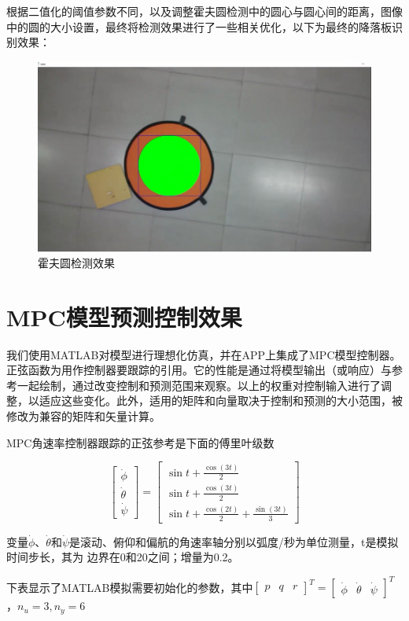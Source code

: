 根据二值化的阈值参数不同，以及调整霍夫圆检测中的圆心与圆心间的距离，图像中的圆的大小设置，最终将检测效果进行了一些相关优化，以下为最终的降落板识别效果：

\begin{figure}[ht]
  \centering
  \includegraphics[width=0.8\linewidth]{./Figure/Hough_Circle_Detection.png}
  \caption{霍夫圆检测效果}\label{Fig:xd1}
\end{figure}

\section{MPC模型预测控制效果}

我们使用MATLAB对模型进行理想化仿真，并在APP上集成了MPC模型控制器。正弦函数为用作控制器要跟踪的引用。它的性能是通过将模型输出（或响应）与参考一起绘制，通过改变控制和预测范围来观察。以上的权重对控制输入进行了调整，以适应这些变化。此外，适用的矩阵和向量取决于控制和预测的大小范围，被修改为兼容的矩阵和矢量计算。

MPC角速率控制器跟踪的正弦参考是下面的傅里叶级数

$$
\left[\begin{array}{c}
\dot{\phi} \\
\dot{\theta} \\
\dot{\psi}
\end{array}\right]=\left[\begin{array}{c}
\sin t+\frac{\cos (3 t)}{2} \\
\sin t+\frac{\cos (3 t)}{2} \\
\sin t+\frac{\cos (2 t)}{2}+\frac{\sin (3 t)}{3}
\end{array}\right]
$$

变量$\dot{\phi}$、$\dot{\theta}$和$\dot{\psi}$是滚动、俯仰和偏航的角速率轴分别以弧度/秒为单位测量，t是模拟时间步长，其为
边界在0和20之间；增量为0.2。

下表显示了MATLAB模拟需要初始化的参数，其中$\left[\begin{array}{lll}p & q & r\end{array}\right]^{T}=\left[\begin{array}{lll}\dot{\phi} & \dot{\theta} & \dot{\psi}\end{array}\right]^{T}$，$n_{u}=3, n_{y}=6$

